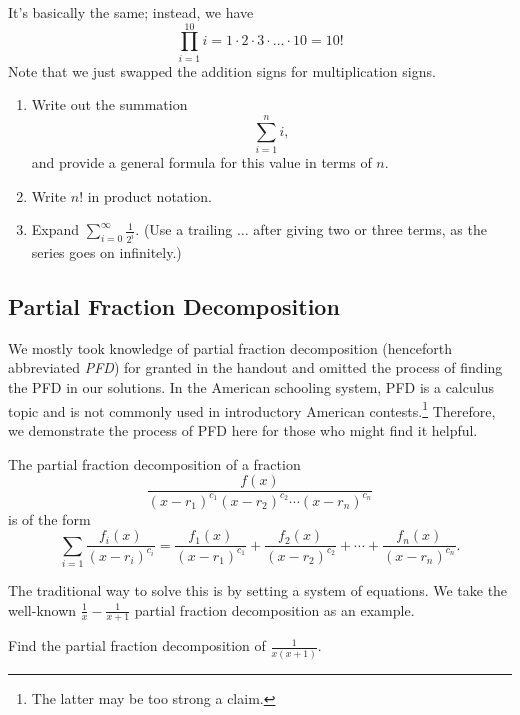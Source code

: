 \documentclass[mast]{lucky}
\begin{document}
\begin{sol}
It's basically the same; instead, we have $$\prod\limits_{i=1}^{10} i=1\cdot 2\cdot 3\cdot \dots \cdot 10=10!$$ Note that we just swapped the addition signs for multiplication signs.
\end{sol}

\begin{exer}\hfill
\begin{enumerate}
    \item Write out the summation $$\sum\limits_{i=1}^{n} i,$$ and provide a general formula for this value in terms of $n.$
    
    \item Write $n!$ in product notation.

    \item Expand $\sum\limits_{i=0}^{\infty} \frac{1}{2^i}.$ (Use a trailing $\dots$ after giving two or three terms, as the series goes on infinitely.)
\end{enumerate}
\end{exer}

\subsection{Partial Fraction Decomposition}

We mostly took knowledge of partial fraction decomposition (henceforth abbreviated \emph{PFD}) for granted in the handout and omitted the process of finding the PFD in our solutions. In the American schooling system, PFD is a calculus topic and is not commonly used in introductory American contests.\footnote{The latter may be too strong a claim.} Therefore, we demonstrate the process of PFD here for those who might find it helpful.

\begin{defi}
The partial fraction decomposition of a fraction
\[\frac{f(x)}{(x-r_1)^{c_1}(x-r_2)^{c_2}\cdots (x-r_n)^{c_n}}\]
is of the form
\[\sum_{i=1}\frac{f_i(x)}{(x-r_i)^{c_i}}=\frac{f_1(x)}{(x-r_1)^{c_1}}+\frac{f_2(x)}{(x-r_2)^{c_2}}+\cdots+\frac{f_n(x)}{(x-r_n)^{c_n}}.\]
\end{defi}

The traditional way to solve this is by setting a system of equations. We take the well-known $\frac{1}{x}-\frac{1}{x+1}$ partial fraction decomposition as an example.

\begin{exam}
Find the partial fraction decomposition of $\frac{1}{x(x+1)}.$
\end{exam}
\end{document}
